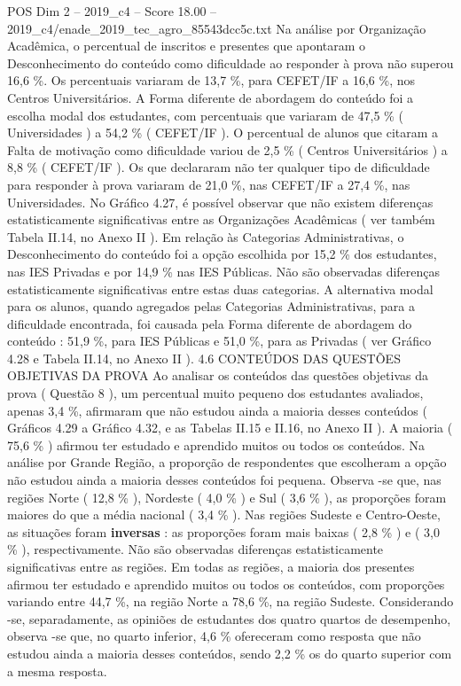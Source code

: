 \begin{textsample}{POS Dim 2 – 2019\_c4 – Score 18.00 – 2019\_c4/enade\_2019\_tec\_agro\_85543dcc5c.txt}
Na análise por Organização Acadêmica, o percentual de inscritos e presentes que apontaram o Desconhecimento do conteúdo como dificuldade ao responder à prova não superou 16,6 \%.
Os percentuais variaram de 13,7 \%, para CEFET/IF a 16,6 \%, nos Centros Universitários.
A Forma diferente de abordagem do conteúdo foi a escolha modal dos estudantes, com percentuais que variaram de 47,5 \% ( Universidades ) a 54,2 \% ( CEFET/IF ).
O percentual de alunos que citaram a Falta de motivação como dificuldade variou de 2,5 \% ( Centros Universitários ) a 8,8 \% ( CEFET/IF ).
Os que declararam não ter qualquer tipo de dificuldade para responder à prova variaram de 21,0 \%, nas CEFET/IF a 27,4 \%, nas Universidades.
No Gráfico 4.27, é possível observar que não existem diferenças estatisticamente significativas entre as Organizações Acadêmicas ( ver também Tabela II.14, no Anexo II ).
Em relação às Categorias Administrativas, o Desconhecimento do conteúdo foi a opção escolhida por 15,2 \% dos estudantes, nas IES Privadas e por 14,9 \% nas IES Públicas.
Não são observadas diferenças estatisticamente significativas entre estas duas categorias.
A alternativa modal para os alunos, quando agregados pelas Categorias Administrativas, para a dificuldade encontrada, foi causada pela Forma diferente de abordagem do conteúdo : 51,9 \%, para IES Públicas e 51,0 \%, para as Privadas ( ver Gráfico 4.28 e Tabela II.14, no Anexo II ). 4.6 CONTEÚDOS DAS QUESTÕES OBJETIVAS DA PROVA Ao analisar os conteúdos das questões objetivas da prova ( Questão 8 ), um percentual muito pequeno dos estudantes avaliados, apenas 3,4 \%, afirmaram que não estudou ainda a maioria desses conteúdos ( Gráficos 4.29 a Gráfico 4.32, e as Tabelas II.15 e II.16, no Anexo II ).
A maioria ( 75,6 \% ) afirmou ter estudado e aprendido muitos ou todos os conteúdos.
Na análise por Grande Região, a proporção de respondentes que escolheram a opção não estudou ainda a maioria desses conteúdos foi pequena.
Observa -se que, nas regiões Norte ( 12,8 \% ), Nordeste ( 4,0 \% ) e Sul ( 3,6 \% ), as proporções foram maiores do que a média nacional ( 3,4 \% ).
Nas regiões Sudeste e Centro-Oeste, as situações foram \textbf{inversas} : as proporções foram mais baixas ( 2,8 \% ) e ( 3,0 \% ), respectivamente.
Não são observadas diferenças estatisticamente significativas entre as regiões.
Em todas as regiões, a maioria dos presentes afirmou ter estudado e aprendido muitos ou todos os conteúdos, com proporções variando entre 44,7 \%, na região Norte a 78,6 \%, na região Sudeste.
Considerando -se, separadamente, as opiniões de estudantes dos quatro quartos de desempenho, observa -se que, no quarto inferior, 4,6 \% ofereceram como resposta que não estudou ainda a maioria desses conteúdos, sendo 2,2 \% os do quarto superior com a mesma resposta.

\end{textsample}
